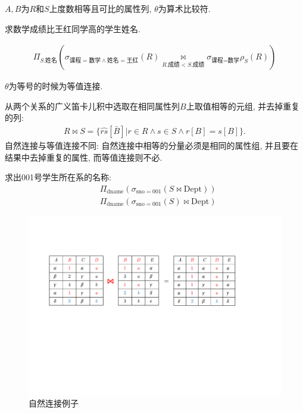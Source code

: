 $A,B$为$R$和$S$上度数相等且可比的属性列, $\theta$为算术比较符.

\begin{example}
求数学成绩比王红同学高的学生姓名.
\end{example}
\begin{align*}
    \Pi_{S.\text{姓名}}\left(\sigma_{\text{课程}=\text{数学}\land \text{姓名}=\text{王红}}(R) \underset{R.\text{成绩}<S.\text{成绩}}{\bowtie}\sigma_{\text{课程}=\text{数学}}\rho_S(R)\right)
\end{align*}

\begin{definition}[等值连接]
$\theta$为等号的时候为等值连接.
\end{definition}

\begin{definition}[自然连接]
从两个关系的广义笛卡儿积中选取在相同属性列$B$上取值相等的元组, 并去掉重复的列:
\begin{align*}
    R \bowtie S = \{ \widehat{rs}[\bar{B}] | r \in R \land s \in S \land r[B]=s[B] \}.
\end{align*}
自然连接与等值连接不同: 自然连接中相等的分量必须是相同的属性组, 并且要在结果中去掉重复的属性, 而等值连接则不必.
\end{definition}

\begin{example}
求出001号学生所在系的名称:
\begin{align*}
    &\Pi_{\text{dname}}(\sigma_{\text{sno}=001}(S\bowtie \text{Dept})) \\
    &\Pi_{\text{dname}}(\sigma_{\text{sno}=001}(S)\bowtie \text{Dept})
\end{align*}
\end{example}

\begin{figure}[H]
    \centering
    \includegraphics[width=.8\textwidth]{./figure/自然连接.pdf}
    \caption{自然连接例子}
\end{figure}

